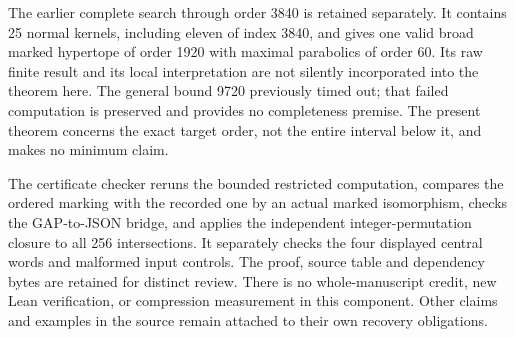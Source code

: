 \documentclass[11pt]{article}
\begin{document}
The earlier complete search through order 3840 is retained separately.
It contains 25 normal kernels, including eleven of index 3840, and gives
one valid broad marked hypertope of order 1920 with maximal parabolics of
order 60. Its raw finite result and its local interpretation are not
silently incorporated into the theorem here. The general bound 9720
previously timed out; that failed computation is preserved and provides
no completeness premise. The present theorem concerns the exact target
order, not the entire interval below it, and makes no minimum claim.

The certificate checker reruns the bounded restricted computation,
compares the ordered marking with the recorded one by an actual marked
isomorphism, checks the GAP-to-JSON bridge, and applies the independent
integer-permutation closure to all 256 intersections. It separately checks
the four displayed central words and malformed input controls. The proof,
source table and dependency bytes are retained for distinct review.
There is no whole-manuscript credit, new Lean verification, or compression
measurement in this component. Other claims and examples in the source
remain attached to their own recovery obligations.
\end{document}
